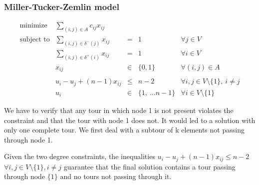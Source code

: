 \subsubsection{Miller-Tucker-Zemlin model}
\begin{equation*}
    \begin{array}{lrllr}
        \textrm{minimize}   & \displaystyle\sum_{(i, j) \in A} c_{ij}  x_{ij} \\
        \textrm{subject to} & \displaystyle\sum\limits_{(i, j) \in \delta^-(j)}  x_{ij} & = & 1 & \forall j \in V\\
                            & \displaystyle\sum\limits_{(i, j) \in \delta^+(i)}  x_{ij} & = & 1 & \forall i \in V\\
                            & x_{ij} & \in & \{0,1\} & \forall (i,j) \in A \\ \\
                            & u_i - u_j + (n-1) x_{ij} & \leq & n - 2 & \forall i, j \in V \setminus \{1\},\ i \neq j \\
                            & u_i & \in & \{1,\ \dots n-1\} & \forall i \in V \setminus \{1\}
    \end{array}
\end{equation*}

We have to verify that any tour in which node 1 is not present violates the
constraint and that the tour with node 1 does not. It would led to a solution
with only one complete tour. 
We first deal with a subtour of k elements not passing through node 1.

\begin{theorem} 
    Given the two degree constraints, the inequalities $u_{i} -
    u_{j} + (n-1) x_{ij} \le n-2$ $\forall i,j\in V \setminus \{1\}, i\neq j$
    guarantee that the final solution contains a tour passing through node 
    $\{1\}$ and no tours not passing through it. 
\end{theorem}

